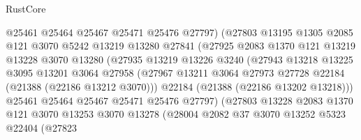 \begin{lexlean}{RustCore}
\begin{coremodule}
                            @25461
                            @25464
                            @25467
                            @25471
                            @25476
                            @27797)
                          (@27803
                            @13195
                            @1305
                            @2085
                            @121
                            @3070
                            @5242
                            @13219
                            @13280
                            @27841
                            (@27925
                              @2083
                              @1370
                              @121
                              @13219
                              @13228
                              @3070
                              @13280
                              (@27935
                                @13219
                                @13226
                                @3240
                                (@27943
                                  @13218
                                  @13225
                                  @3095
                                  @13201
                                  @3064
                                  @27958
                                  (@27967
                                    @13211
                                    @3064
                                    @27973
                                    @27728
                                    @22184
                                    (@21388 (@22186 @13212 @3070)))
                                  @22184
                                  (@21388 (@22186 @13202 @13218)))
                                @25461
                                @25464
                                @25467
                                @25471
                                @25476
                                @27797)
                              (@27803
                                @13228
                                @2083
                                @1370
                                @121
                                @3070
                                @13253
                                @3070
                                @13278
                                (@28004
                                  @2082
                                  @37
                                  @3070
                                  @13252
                                  @5323
                                  @22404
                                  (@27823

\end{coremodule}
\end{lexlean}
